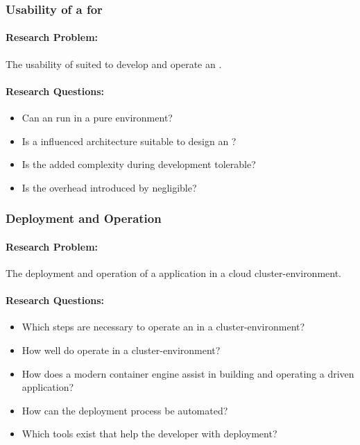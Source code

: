 \subsubsection{Usability of a \ms{} for \ogs{}} 

\paragraph{Research Problem:} The usability of \ms{} suited to develop and
operate an \og{}.

\paragraph{Research Questions:}
\begin{itemize}
  \item Can an \og{} run in a pure \ms{} environment?
  \item Is a \ms{} influenced architecture suitable to design an \og{}?
  \item Is the added complexity during development tolerable?
  \item Is the overhead introduced by \mss{} negligible? 
\end{itemize}

\subsubsection{Deployment and Operation}

\paragraph{Research Problem:} The deployment and operation of a \ms{}
application in a cloud cluster-environment.

\paragraph{Research Questions:}
\begin{itemize}
  \item Which steps are necessary to operate an \og{} in a cluster-environment?
  \item How well do \ogs{} operate in a cluster-environment?
  \item How does a modern container engine assist in building and operating a
  \ms{} driven application?
  \item How can the deployment process be automated?
  \item Which tools exist that help the developer with deployment?
\end{itemize}


